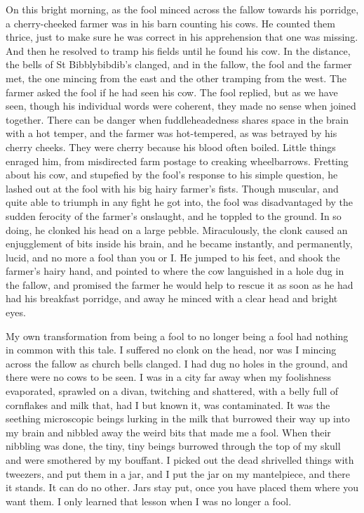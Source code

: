 On this bright morning, as the fool minced across the fallow towards his porridge, a cherry-cheeked farmer was in his barn counting his cows. He counted them thrice, just to make sure he was correct in his apprehension that one was missing. And then he resolved to tramp his fields until he found his cow. In the distance, the bells of St Bibblybibdib's clanged, and in the fallow, the fool and the farmer met, the one mincing from the east and the other tramping from the west. The farmer asked the fool if he had seen his cow. The fool replied, but as we have seen, though his individual words were coherent, they made no sense when joined together. There can be danger when fuddleheadedness shares space in the brain with a hot temper, and the farmer was hot-tempered, as was betrayed by his cherry cheeks. They were cherry because his blood often boiled. Little things enraged him, from misdirected farm postage to creaking wheelbarrows. Fretting about his cow, and stupefied by the fool's response to his simple question, he lashed out at the fool with his big hairy farmer's fists. Though muscular, and quite able to triumph in any fight he got into, the fool was disadvantaged by the sudden ferocity of the farmer's onslaught, and he toppled to the ground. In so doing, he clonked his head on a large pebble. Miraculously, the clonk caused an enjugglement of bits inside his brain, and he became instantly, and permanently, lucid, and no more a fool than you or I. He jumped to his feet, and shook the farmer's hairy hand, and pointed to where the cow languished in a hole dug in the fallow, and promised the farmer he would help to rescue it as soon as he had had his breakfast porridge, and away he minced with a clear head and bright eyes.

My own transformation from being a fool to no longer being a fool had nothing in common with this tale. I suffered no clonk on the head, nor was I mincing across the fallow as church bells clanged. I had dug no holes in the ground, and there were no cows to be seen. I was in a city far away when my foolishness evaporated, sprawled on a divan, twitching and shattered, with a belly full of cornflakes and milk that, had I but known it, was contaminated. It was the seething microscopic beings lurking in the milk that burrowed their way up into my brain and nibbled away the weird bits that made me a fool. When their nibbling was done, the tiny, tiny beings burrowed through the top of my skull and were smothered by my bouffant. I picked out the dead shrivelled things with tweezers, and put them in a jar, and I put the jar on my mantelpiece, and there it stands. It can do no other. Jars stay put, once you have placed them where you want them. I only learned that lesson when I was no longer a fool.
